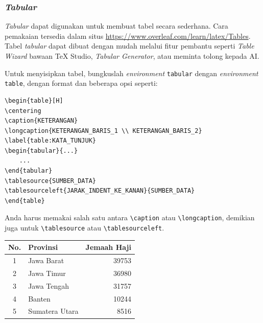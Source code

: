 \subsubsection{\textit{Tabular}}

\textit{Tabular} dapat digunakan untuk membuat tabel secara sederhana. Cara pemakaian tersedia dalam situs \url{https://www.overleaf.com/learn/latex/Tables}. Tabel \textit{tabular} dapat dibuat dengan mudah melalui fitur pembantu seperti \textit{Table Wizard} bawaan TeX Studio, \textit{Tabular Generator}, atau meminta tolong kepada AI.

Untuk menyisipkan tabel, bungkuslah \textit{environment} \texttt{tabular} dengan \textit{environment} \texttt{table}, dengan format dan beberapa opsi seperti:
\begin{lstlisting}[]
\begin{table}[H]
\centering
\caption{KETERANGAN}
\longcaption{KETERANGAN_BARIS_1 \\ KETERANGAN_BARIS_2}
\label{table:KATA_TUNJUK}
\begin{tabular}{...}
    ...
\end{tabular}
\tablesource{SUMBER_DATA}
\tablesourceleft{JARAK_INDENT_KE_KANAN}{SUMBER_DATA}
\end{table}
\end{lstlisting}

Anda harus memakai salah satu antara \verb|\caption| atau \verb|\longcaption|, demikian juga untuk \verb|\tablesource| atau \verb|\tablesourceleft|.

\begin{table}[H]
    \centering
    \label{table:5-provinsi-jemaah-haji}
    \begin{tabular}{c l r}
        \hline
        No. & Provinsi & Jemaah Haji \\
        \hline
        1 & Jawa Barat & 39753 \\
        2 & Jawa Timur & 36980 \\
        3 & Jawa Tengah & 31757 \\
        4 & Banten & 10244 \\
        5 & Sumatera Utara & 8516 \\
        \hline
    \end{tabular}
\end{table}

